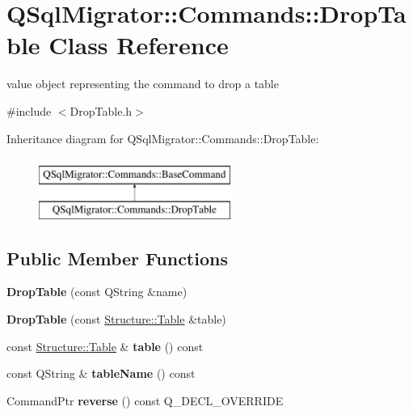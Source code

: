 \hypertarget{class_q_sql_migrator_1_1_commands_1_1_drop_table}{}\section{Q\+Sql\+Migrator\+:\+:Commands\+:\+:Drop\+Table Class Reference}
\label{class_q_sql_migrator_1_1_commands_1_1_drop_table}


value object representing the command to drop a table  




{\ttfamily \#include $<$Drop\+Table.\+h$>$}

Inheritance diagram for Q\+Sql\+Migrator\+:\+:Commands\+:\+:Drop\+Table\+:\begin{figure}[H]
\begin{center}
\leavevmode
\includegraphics[height=2.000000cm]{class_q_sql_migrator_1_1_commands_1_1_drop_table}
\end{center}
\end{figure}
\subsection*{Public Member Functions}
\begin{DoxyCompactItemize}
\item 
\mbox{\label{class_q_sql_migrator_1_1_commands_1_1_drop_table_a5614e91b2546afaa7496b7ebaa2626a0}} 
{\bfseries Drop\+Table} (const Q\+String \&name)
\item 
\mbox{\label{class_q_sql_migrator_1_1_commands_1_1_drop_table_af631db3f5276b36f2a37319b580a5fe9}} 
{\bfseries Drop\+Table} (const \hyperlink{class_q_sql_migrator_1_1_structure_1_1_table}{Structure\+::\+Table} \&table)
\item 
\mbox{\label{class_q_sql_migrator_1_1_commands_1_1_drop_table_a17d5d22d2c4246ac50ec3dd4637eca20}} 
const \hyperlink{class_q_sql_migrator_1_1_structure_1_1_table}{Structure\+::\+Table} \& {\bfseries table} () const
\item 
\mbox{\label{class_q_sql_migrator_1_1_commands_1_1_drop_table_a0c6c39b4da845853a2cf5ba9699dbc83}} 
const Q\+String \& {\bfseries table\+Name} () const
\item 
\mbox{\label{class_q_sql_migrator_1_1_commands_1_1_drop_table_a8436f051ee9d65ac9fc8d65a2b6d91ac}} 
Command\+Ptr {\bfseries reverse} () const Q\+\_\+\+D\+E\+C\+L\+\_\+\+O\+V\+E\+R\+R\+I\+DE
\end{DoxyCompactItemize}
